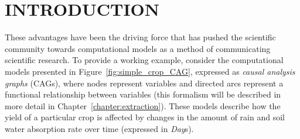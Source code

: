 \chapter{INTRODUCTION\label{chapter:introduction}}


These advantages have been the driving force that has pushed the scientific community towards computational models as a method of communicating scientific research.
To provide a working example, consider the computational models presented in Figure~\ref{fig:simple_crop_CAG}, expressed as \emph{causal analysis graphs} (CAGs), where nodes represent variables and directed arcs represent a functional relationship between variables (this formalism will be described in more detail in Chapter~\ref{chapter:extraction}).
These models describe how the yield of a particular crop is affected by changes in the amount of rain and soil water absorption rate over time (expressed in \emph{Day}s).

